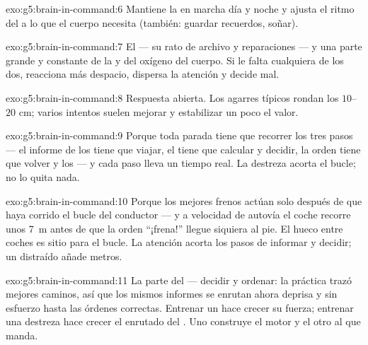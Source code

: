 \begin{solution}{exo:g5:brain-in-command:6}
Mantiene la  en marcha día y noche y ajusta el ritmo del
 a lo que el cuerpo necesita (también: guardar recuerdos,
soñar).
\end{solution}

\begin{solution}{exo:g5:brain-in-command:7}
El  --- su rato de archivo y reparaciones --- y una parte grande
y constante de la  y del oxígeno del cuerpo. Si le falta
cualquiera de los dos, reacciona más despacio, dispersa la atención y
decide mal.
\end{solution}

\begin{solution}{exo:g5:brain-in-command:8}
Respuesta abierta. Los agarres típicos rondan los $10$--$20$ cm;
varios intentos suelen mejorar y estabilizar un poco el valor.
\end{solution}

\begin{solution}{exo:g5:brain-in-command:9}
Porque toda parada tiene que recorrer los tres pasos --- el informe de
los  tiene que viajar, el  tiene que calcular y decidir, la
orden tiene que volver y los   --- y cada paso lleva
un tiempo real. La destreza acorta el bucle; no lo quita nada.
\end{solution}

\begin{solution}{exo:g5:brain-in-command:10}
Porque los mejores frenos actúan solo después de que haya corrido el
bucle del conductor --- y a velocidad de autovía el coche recorre unos
\qty{7}{m} antes de que la orden ``¡frena!'' llegue siquiera al pie.
El hueco entre coches es sitio para el bucle. La atención acorta los
pasos de informar y decidir; un  distraído añade metros.
\end{solution}

\begin{solution}{exo:g5:brain-in-command:11}
La parte del  --- decidir y ordenar: la práctica trazó mejores
caminos, así que los mismos informes se enrutan ahora deprisa y sin
esfuerzo hasta las órdenes correctas. Entrenar un  hace crecer
su fuerza; entrenar una destreza hace crecer el enrutado del .
Uno construye el motor y el otro al que manda.
\end{solution}
